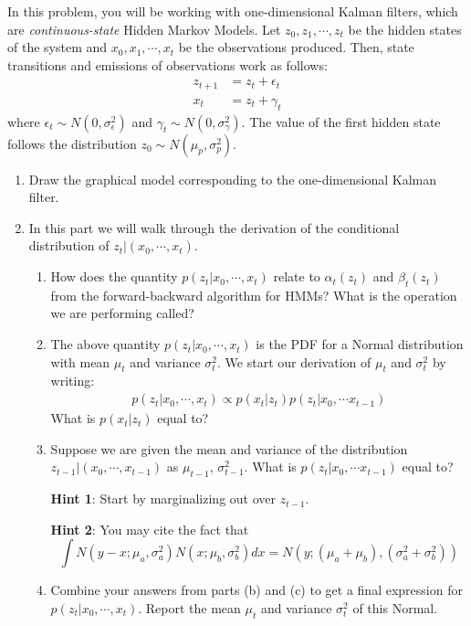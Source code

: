 \documentclass[submit]{../harvardml}
\newcommand{\sigeps}{\sigma_{\epsilon}}
\newcommand{\siggam}{\sigma_{\gamma}}
\newcommand{\muzp}{\mu_{p}}
\newcommand{\sigzp}{\sigma_{p}}
\begin{document}
\begin{problem}
In this problem, you will be working with one-dimensional Kalman filters, which are \textit{continuous-state} Hidden Markov Models. Let $z_0, z_1, \cdots , z_t$ be the hidden states of the system and $x_0, x_1, \cdots, x_t$ be the observations produced. Then, state transitions and emissions of observations work as follows:
  \begin{eqnarray*}
    z_{t+1} &= z_{t} + \epsilon_{t} \\
    x_{t} & = z_{t} + \gamma_{t}
  \end{eqnarray*}
 where $\epsilon_t \sim N(0,\sigeps^2)$ and $\gamma_t \sim N(0,\siggam^2)$. The value of the first hidden state follows the distribution $z_0 \sim N(\muzp,\sigzp^2)$.

\begin{enumerate}
  \item Draw the graphical model corresponding to the one-dimensional Kalman filter.
  \item In this part we will walk through the derivation of the conditional distribution of $z_t|(x_0, \cdots, x_{t})$.
  \begin{enumerate}
      \item How does the quantity $p(z_t| x_0, \cdots, x_{t})$ relate to $\alpha_t(z_t)$ and $\beta_t(z_t)$ from the forward-backward algorithm for HMMs?  What is the operation we are performing called?
      \item The above quantity $p(z_t|x_0, \cdots, x_t)$ is the PDF for a Normal distribution with mean $\mu_t$ and variance $\sigma_t^2$. We start our derivation of $\mu_t$ and $\sigma_t^2$ by writing:
      \begin{align*}
          p(z_t|x_0, \cdots, x_t) \propto p(x_t|z_t)p(z_t|x_0, \cdots x_{t-1})
      \end{align*}
      What is $p(x_t|z_t)$ equal to?
      \item Suppose we are given the mean and variance of the distribution $z_{t-1}|(x_0, \cdots, x_{t-1})$ as $\mu_{t-1}$, $\sigma^2_{t-1}$. What is $p(z_t|x_0, \cdots x_{t-1})$ equal to? 
      
      \textbf{Hint 1}: Start by marginalizing out over $z_{t-1}$.
      
      \textbf{Hint 2}: You may cite the fact that 
      \[\int N(y-x ; \mu_a, \sigma^2_a)N(x ; \mu_b, \sigma^2_b)dx = N(y ; (\mu_a + \mu_b), (\sigma^2_a + \sigma^2_b))\]
      \item Combine your answers from parts (b) and (c) to get a final expression for $p(z_t|x_0, \cdots, x_t)$. Report the mean $\mu_t$ and variance $\sigma_t^2$ of this Normal.


\end{enumerate}
\end{enumerate}
\end{problem}
\end{document}
